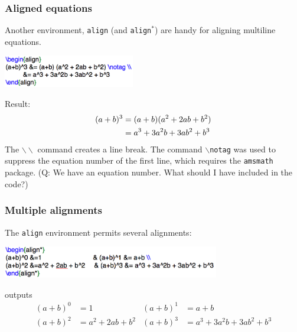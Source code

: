 \begin{frame} \frametitle{Aligned equations}
	Another environment, \texttt{\color{highlight}align} (and \texttt{\color{highlight}align$^*$}) are handy for aligning multiline equations.
	\begin{center}
		\includegraphics[height=14mm]{math/images/align}
	\end{center}
	Result:
	\begin{align}
	(a+b)^3 &= (a+b) (a^2 + 2ab + b^2) \notag \\
	&= a^3 + 3a^2b + 3ab^2 + b^3
	\end{align}
	The \texttt{\color{command}$\backslash\backslash$} command creates a line break. The command \texttt{\color{command}$\backslash$notag} was used to suppress the equation number of the first line, which requires the \texttt{\color{highlight}amsmath} package. (Q: We have an equation number. What should I have included in the code?)
\end{frame}

\begin{frame} \frametitle{Multiple alignments}
	The \texttt{\color{highlight}align} environment permits several alignments:
	\begin{center}
		\includegraphics[height=14mm]{math/images/alignMany}
	\end{center}
	outputs
	\begin{align*}
	(a+b)^0 &=1                            & (a+b)^1 &= a+b \\
	(a+b)^2 &=a^2 + 2ab + b^2     & (a+b)^3 &= a^3 + 3a^2b + 3ab^2 + b^3
	\end{align*}
\end{frame}

